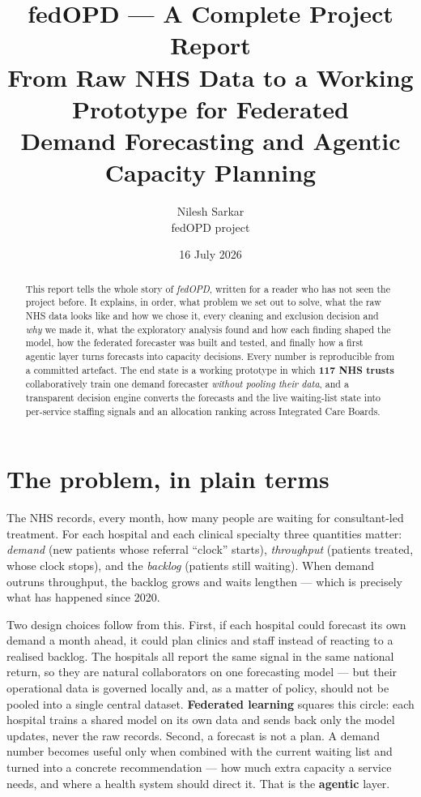 \documentclass[11pt,a4paper]{article}
\title{\textbf{fedOPD --- A Complete Project Report}\\[0.3em]
\large From Raw NHS Data to a Working Prototype for Federated\\ Demand Forecasting and Agentic Capacity Planning}
\author{Nilesh Sarkar \\ \small fedOPD project}
\date{16 July 2026}
\begin{document}
\maketitle

\begin{abstract}
This report tells the whole story of \emph{fedOPD}, written for a reader who has not seen the project
before. It explains, in order, what problem we set out to solve, what the raw NHS data looks like and
how we chose it, every cleaning and exclusion decision and \emph{why} we made it, what the exploratory
analysis found and how each finding shaped the model, how the federated forecaster was built and
tested, and finally how a first agentic layer turns forecasts into capacity decisions. Every number is
reproducible from a committed artefact. The end state is a working prototype in which \textbf{117 NHS
trusts} collaboratively train one demand forecaster \emph{without pooling their data}, and a
transparent decision engine converts the forecasts and the live waiting-list state into per-service
staffing signals and an allocation ranking across Integrated Care Boards.
\end{abstract}

\tableofcontents
\clearpage

\section{The problem, in plain terms}\label{sec:problem}
The NHS records, every month, how many people are waiting for consultant-led treatment. For each
hospital and each clinical specialty three quantities matter: \emph{demand} (new patients whose
referral ``clock'' starts), \emph{throughput} (patients treated, whose clock stops), and the
\emph{backlog} (patients still waiting). When demand outruns throughput, the backlog grows and waits
lengthen --- which is precisely what has happened since 2020.

Two design choices follow from this. First, if each hospital could forecast its own demand a month
ahead, it could plan clinics and staff instead of reacting to a realised backlog. The hospitals all
report the same signal in the same national return, so they are natural collaborators on one
forecasting model --- but their operational data is governed locally and, as a matter of policy,
should not be pooled into a single central dataset. \textbf{Federated learning} squares this circle:
each hospital trains a shared model on its own data and sends back only the model updates, never the
raw records. Second, a forecast is not a plan. A demand number becomes useful only when combined with
the current waiting list and turned into a concrete recommendation --- how much extra capacity a
service needs, and where a health system should direct it. That is the \textbf{agentic} layer.
\end{document}
